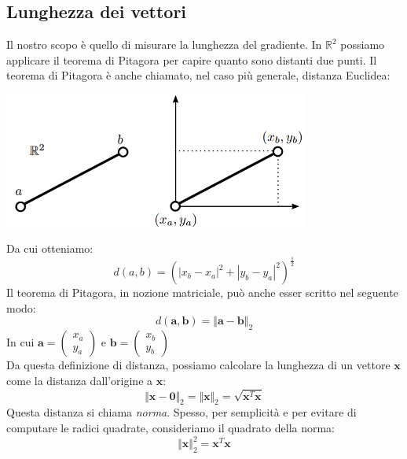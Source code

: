 \documentclass{article}
\begin{document}
        \subsection{Lunghezza dei vettori}
            Il nostro scopo è quello di misurare la lunghezza del gradiente. In $\mathbb{R}^2$ possiamo applicare il teorema di 
            Pitagora per capire quanto sono distanti due punti. Il teorema di Pitagora è anche chiamato, nel caso più generale, distanza Euclidea:
            \begin{center}\includegraphics[width=10cm]{euclidean_distance.png}\end{center}
            Da cui otteniamo:
            \[d(a,b) = (|x_b - x_a|^2 + |y_b - y_a|^2)^{\frac{1}{2}}\]
            Il teorema di Pitagora, in nozione matriciale, può anche esser scritto nel seguente modo:
                \[d(\mathbf{a},\mathbf{b}) = \Vert \mathbf{a} - \mathbf{b} \Vert_2\]
            In cui $\mathbf{a} = \begin{pmatrix}
                x_a \\
                y_a
            \end{pmatrix}$ e $\mathbf{b} = \begin{pmatrix}
                x_b \\
                y_b
            \end{pmatrix}$ \\

            Da questa definizione di distanza, possiamo calcolare la lunghezza di un vettore $\mathbf{x}$ come la distanza dall'origine a 
            $\mathbf{x}$:
                \[\Vert \mathbf{x} - \mathbf{0} \Vert_2 = \Vert \mathbf{x} \Vert_2 = \sqrt{\mathbf{x}^T\mathbf{x}} \]
            Questa distanza si chiama \emph{norma}. 
            Spesso, per semplicità e per evitare di computare le radici quadrate, consideriamo il quadrato della norma:
                \[\Vert \mathbf{x} \Vert_2^2 = \mathbf{x}^T\mathbf{x}\]
\end{document}
